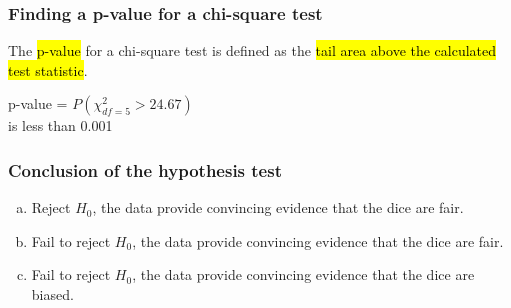 
\begin{frame}
\frametitle{Finding a p-value for a chi-square test}

The \hl{p-value} for a chi-square test is defined as the \hl{tail area above the calculated test statistic}.

{
p-value = $P(\chi^2_{df = 5} > 24.67)$\\ is less than 0.001
}

\end{frame}


\begin{frame}
\frametitle{Conclusion of the hypothesis test}


\begin{enumerate}[(a)]
\item Reject $H_0$, the data provide convincing evidence that the dice are fair.
\item Fail to reject $H_0$, the data provide convincing evidence that the dice are fair.
\item Fail to reject $H_0$, the data provide convincing evidence that the dice are biased.
\end{enumerate}

\end{frame}


